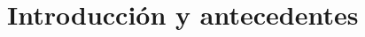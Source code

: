 \documentclass[12pt,a4paper,openright,oneside]{article}
\numberwithin{equation}{section}
\theoremstyle{definition}
\begin{document}
\newpage
{} 





\newpage 

\tableofcontents

\newpage

\setcounter{page}{1}


\section{Introducción y antecedentes}




\end{document}

